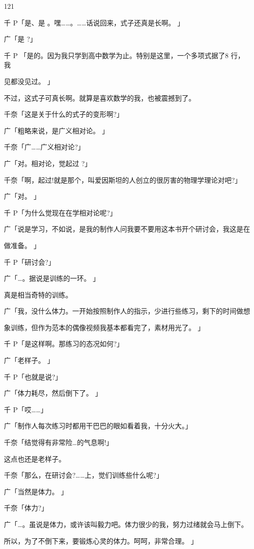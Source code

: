 121\par
千 P「是、是 。嘿……。……话说回来，式子还真是长啊。 」\par
广「是 ?」\par
千 P 「是的。因为我只学到高中数学为止。特别是这里，一个多项式据了8 行，我\par
见都没见过。 」\par
不过，这式子可真长啊。就算是喜欢数学的我，也被震撼到了。\par
千奈「这是关于什么的式子的变形啊?」\par
广「粗略来说，是广义相对论。 」\par
千奈「广……广义相对论?」\par
广「对。相对论，觉起过 ?」\par
千奈「啊，起过!就是那个，叫爱因斯坦的人创立的很厉害的物理学理论对吧?」\par
广「对。 」\par
千 P「为什么觉现在在学相对论呢?」\par
广「说是学习，不如说，是我的制作人问我要不要用这本书开个研讨会，我这是在\par
做准备。 」\par
千 P「研讨会?」\par
广「…。据说是训练的一环。 」\par
真是相当奇特的训练。\par
广「我，没什么体力。一开始按照制作人的指示，少进行些练习，剩下的时间做想\par
象训练，但作为范本的偶像视频我基本都看完了，素材用光了。 」\par
千 P「是这样啊。那练习的态况如何?」\par
广「老样子。 」\par
千 P「也就是说?」\par
广「体力耗尽，然后倒下了。 」\par
千 P「哎……」\par
广「制作人每次练习时都用干巴巴的眼如看着我，十分火大。」\par
千奈「结觉得有非常险…的气息啊!」\par
这点也还是老样子。\par
千奈「那么，在研讨会?……上，觉们训练些什么呢?」\par
广「当然是体力。 」\par
千奈「体力?」\par
广「…。虽说是体力，或许该叫毅力吧。体力很少的我，努力过绪就会马上倒下。\par
所以，为了不倒下来，要锻炼心灵的体力。呵呵，非常合理。 」\par

